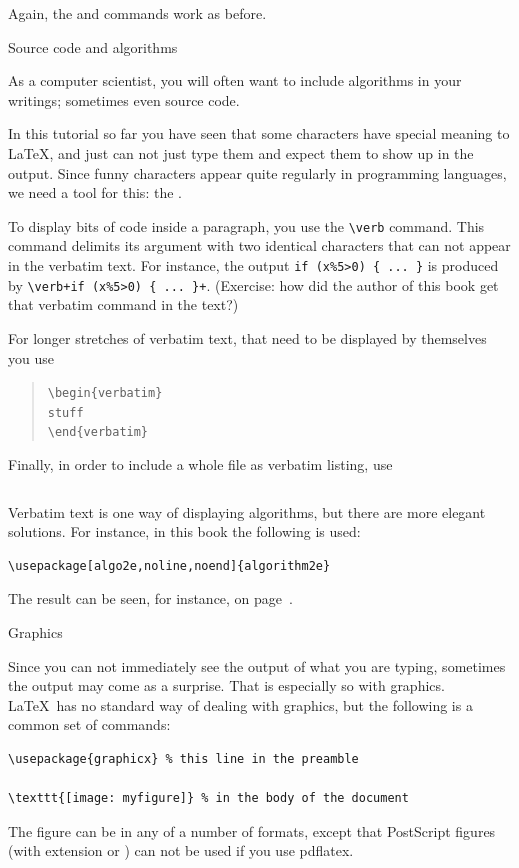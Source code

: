 {Again, the \n{\\label} and \n{\\ref} commands work as before.}{}

 {Source code and algorithms}

As a computer scientist, you will often want to include 
algorithms in your writings; sometimes even source code.

In this tutorial so far you have seen that some characters
have special meaning to \LaTeX{}, and just can not just type them
and expect them to show up in the output. Since funny characters
appear quite regularly in programming languages, we need a tool for this:
the .

To display bits of code inside a paragraph, you use the \verb+\verb+
command.  This command delimits its argument with two identical
characters that can not appear in the verbatim text. For instance,
the output
\verb+if (x%5>0) { ... }+ is produced by \verb/\verb+if (x%5>0) { ... }+/.
(Exercise: how did the author of this book get that verbatim command
in the text?)

For longer stretches of verbatim text, that need to be displayed
by themselves you use
\begin{quote}
\leavevmode\noindent\parindent=0pt
\hbox{\verb+\begin{verbatim}+}\\
\hbox{\verb+stuff+}\\
\hbox{\verb+\end{verbatim}+}
\end{quote}
Finally, in order to include a whole file as verbatim listing, use
\begin{verbatim}

\end{verbatim}

Verbatim text is one way of displaying algorithms, but there are
more elegant solutions. For instance, in this book the following is
used:
\begin{verbatim}
\usepackage[algo2e,noline,noend]{algorithm2e}
\end{verbatim}
The result can be seen, for instance, on page~\pageref{fig:taskqueue}.

 {Graphics}

Since you can not immediately see the output of what you are typing,
sometimes the output may come as a surprise. That is especially so
with graphics. \LaTeX\ has no standard way of dealing with graphics,
but the following is a common set of commands:
\begin{verbatim}
\usepackage{graphicx} % this line in the preamble

\texttt{[image: myfigure]} % in the body of the document
\end{verbatim}
The figure can be in any of a number of formats, except that
PostScript figures (with extension  or )
can not be used if you use pdflatex.

